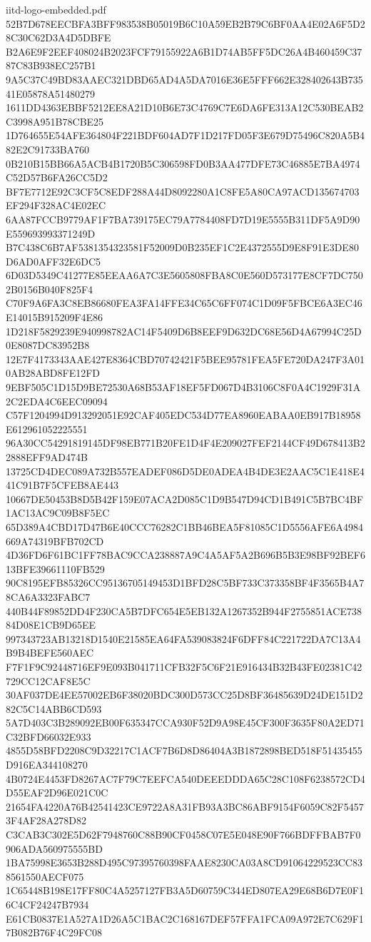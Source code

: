 \begin{filecontents*}[overwrite]{iitd-logo-embedded.pdf}
52B7D678EECBFA3BFF983538B05019B6C10A59EB2B79C6BF0AA4E02A6F5D28C30C62D3A4D5DBFE
B2A6E9F2EEF408024B2023FCF79155922A6B1D74AB5FF5DC26A4B460459C3787C83B938EC257B1
9A5C37C49BD83AAEC321DBD65AD4A5DA7016E36E5FFF662E328402643B73541E05878A51480279
1611DD4363EBBF5212EE8A21D10B6E73C4769C7E6DA6FE313A12C530BEAB2C3998A951B78CBE25
1D764655E54AFE364804F221BDF604AD7F1D217FD05F3E679D75496C820A5B482E2C91733BA760
0B210B15BB66A5ACB4B1720B5C306598FD0B3AA477DFE73C46885E7BA4974C52D57B6FA26CC5D2
BF7E7712E92C3CF5C8EDF288A44D8092280A1C8FE5A80CA97ACD135674703EF294F328AC4E02EC
6AA87FCCB9779AF1F7BA739175EC79A7784408FD7D19E5555B311DF5A9D90E559693993371249D
B7C438C6B7AF5381354323581F52009D0B235EF1C2E4372555D9E8F91E3DE80D6AD0AFF32E6DC5
6D03D5349C41277E85EEAA6A7C3E5605808FBA8C0E560D573177E8CF7DC7502B0156B040F825F4
C70F9A6FA3C8EB86680FEA3FA14FFE34C65C6FF074C1D09F5FBCE6A3EC46E14015B915209F4E86
1D218F5829239E940998782AC14F5409D6B8EEF9D632DC68E56D4A67994C25D0E8087DC83952B8
12E7F4173343AAE427E8364CBD70742421F5BEE95781FEA5FE720DA247F3A010AB28ABD8FE12FD
9EBF505C1D15D9BE72530A68B53AF18EF5FD067D4B3106C8F0A4C1929F31A2C2EDA4C6EEC09094
C57F1204994D913292051E92CAF405EDC534D77EA8960EABAA0EB917B18958E612961052225551
96A30CC54291819145DF98EB771B20FE1D4F4E209027FEF2144CF49D678413B22888EFF9AD474B
13725CD4DEC089A732B557EADEF086D5DE0ADEA4B4DE3E2AAC5C1E418E441C91B7F5CFEB8AE443
10667DE50453B8D5B42F159E07ACA2D085C1D9B547D94CD1B491C5B7BC4BF1AC13AC9C09B8F5EC
65D389A4CBD17D47B6E40CCC76282C1BB46BEA5F81085C1D5556AFE6A4984669A74319BFB702CD
4D36FD6F61BC1FF78BAC9CCA238887A9C4A5AF5A2B696B5B3E98BF92BEF613BFE39661110FB529
90C8195EFB85326CC95136705149453D1BFD28C5BF733C373358BF4F3565B4A78CA6A3323FABC7
440B44F89852DD4F230CA5B7DFC654E5EB132A1267352B944F2755851ACE73884D08E1CB9D65EE
997343723AB13218D1540E21585EA64FA539083824F6DFF84C221722DA7C13A4B9B4BEFE560AEC
F7F1F9C92448716EF9E093B041711CFB32F5C6F21E916434B32B43FE02381C42729CC12CAF8E5C
30AF037DE4EE57002EB6F38020BDC300D573CC25D8BF36485639D24DE151D282C5C14ABB6CD593
5A7D403C3B289092EB00F635347CCA930F52D9A98E45CF300F3635F80A2ED71C32BFD66032E933
4855D58BFD2208C9D32217C1ACF7B6D8D86404A3B1872898BED518F51435455D916EA344108270
4B0724E4453FD8267AC7F79C7EEFCA540DEEEDDDA65C28C108F6238572CD4D55EAF2D96E021C0C
21654FA4220A76B42541423CE9722A8A31FB93A3BC86ABF9154F6059C82F54573F4AF28A278D82
C3CAB3C302E5D62F7948760C88B90CF0458C07E5E048E90F766BDFFBAB7F0906ADA560975555BD
1BA75998E3653B288D495C97395760398FAAE8230CA03A8CD91064229523CC838561550AECF075
1C65448B198E17FF80C4A5257127FB3A5D60759C344ED807EA29E68B6D7E0F16C4CF24247B7934
E61CB0837E1A527A1D26A5C1BAC2C168167DEF57FFA1FCA09A972E7C629F17B082B76F4C29FC08

\end{filecontents*}
